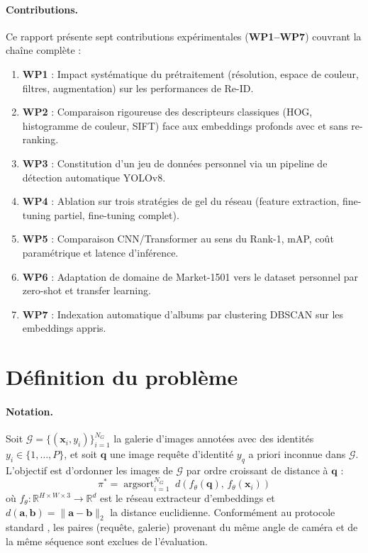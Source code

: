 \paragraph{Contributions.}
Ce rapport présente sept contributions expérimentales (\textbf{WP1--WP7}) couvrant la chaîne complète :
\begin{enumerate}
\item \textbf{WP1} : Impact systématique du prétraitement (résolution, espace de couleur, filtres, augmentation) sur les performances de Re-ID.
\item \textbf{WP2} : Comparaison rigoureuse des descripteurs classiques (HOG, histogramme de couleur, SIFT) face aux embeddings profonds avec et sans re-ranking.
\item \textbf{WP3} : Constitution d'un jeu de données personnel via un pipeline de détection automatique YOLOv8.
\item \textbf{WP4} : Ablation sur trois stratégies de gel du réseau (feature extraction, fine-tuning partiel, fine-tuning complet).
\item \textbf{WP5} : Comparaison CNN/Transformer au sens du Rank-1, mAP, co\^{u}t paramétrique et latence d'inférence.
\item \textbf{WP6} : Adaptation de domaine de Market-1501 vers le dataset personnel par zero-shot et transfer learning.
\item \textbf{WP7} : Indexation automatique d'albums par clustering DBSCAN sur les embeddings appris.
\end{enumerate}

\section{Définition du problème}
\label{sec:problem}

\paragraph{Notation.}
Soit $\mathcal{G} = \{(\mathbf{x}_i, y_i)\}_{i=1}^{N_G}$ la galerie d'images annotées avec des identités $y_i \in \{1, \ldots, P\}$, et soit $\mathbf{q}$ une image requête d'identité $y_q$ a priori inconnue dans $\mathcal{G}$. L'objectif est d'ordonner les images de $\mathcal{G}$ par ordre croissant de distance à $\mathbf{q}$ :
\begin{equation}
\pi^* = \operatorname{argsort}_{i=1}^{N_G} \; d\!\left(f_\theta(\mathbf{q}),\, f_\theta(\mathbf{x}_i)\right)
\label{eq:ranking}
\end{equation}
o\`{u} $f_\theta : \mathbb{R}^{H \times W \times 3} \to \mathbb{R}^d$ est le réseau extracteur d'embeddings et $d(\mathbf{a}, \mathbf{b}) = \|\mathbf{a} - \mathbf{b}\|_2$ la distance euclidienne. Conformément au protocole standard \cite{zheng2015scalable}, les paires (requête, galerie) provenant du même angle de caméra et de la même séquence sont exclues de l'évaluation.

